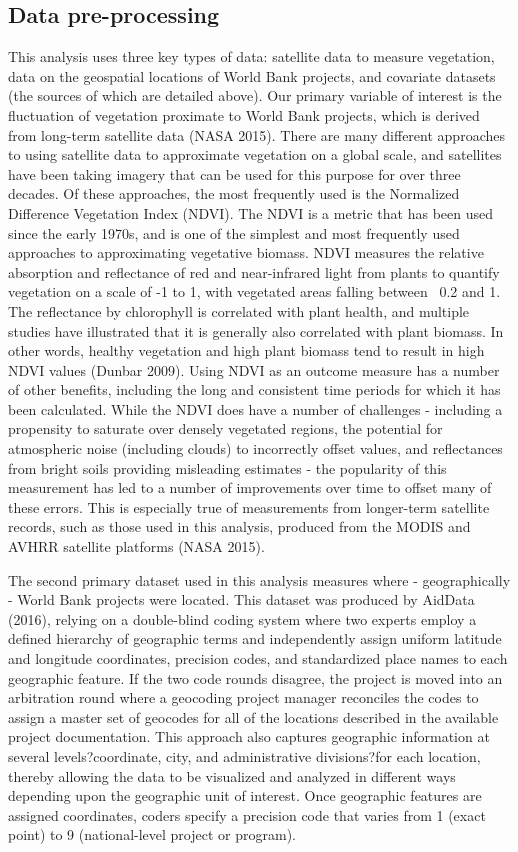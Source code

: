 \subsection{Data pre-processing}
  This analysis uses three key types of data: satellite data to measure vegetation, data on the geospatial locations of World Bank projects, and covariate datasets (the sources of which are detailed above). 
Our primary variable of interest is the fluctuation of vegetation proximate to World Bank projects, which is derived from long-term satellite data (NASA 2015). 
There are many different approaches to using satellite data to approximate vegetation on a global scale, and satellites have been taking imagery that can be used for this purpose for over three decades.  
Of these approaches, the most frequently used is the Normalized Difference Vegetation Index (NDVI).  The NDVI is a metric that has been used since the early 1970s, and is one of the simplest and most frequently used approaches to approximating vegetative biomass.  
NDVI measures the relative absorption and reflectance of red and near-infrared light from plants to quantify vegetation on a scale of -1 to 1, with vegetated areas falling between ~0.2 and 1. 
The reflectance by chlorophyll is correlated with plant health, and multiple studies have illustrated that it is generally also correlated with plant biomass. 
In other words, healthy vegetation and high plant biomass tend to result in high NDVI values (Dunbar 2009).  
Using NDVI as an outcome measure has a number of other benefits, including the long and consistent time periods for which it has been calculated.  
While the NDVI does have a number of challenges - including a propensity to saturate over densely vegetated regions, the potential for atmospheric noise (including clouds) to incorrectly offset values, and reflectances from bright soils providing misleading estimates - the popularity of this measurement has led to a number of improvements over time to offset many of these errors.  
This is especially true of measurements from longer-term satellite records, such as those used in this analysis, produced from the MODIS and AVHRR satellite platforms (NASA 2015).
\par
The second primary dataset used in this analysis measures where - geographically - World Bank projects were located.  This dataset was produced by AidData (2016), relying on a double-blind coding system where two experts employ a defined hierarchy of geographic terms and independently assign uniform latitude and longitude coordinates, precision codes, and standardized place names to each geographic feature. If the two code rounds disagree, the project is moved into an arbitration round where a geocoding project manager reconciles the codes to assign a master set of geocodes for all of the locations described in the available project documentation. This approach also captures geographic information at several levels?coordinate, city, and administrative divisions?for each location, thereby allowing the data to be visualized and analyzed in different ways depending upon the geographic unit of interest. Once geographic features are assigned coordinates, coders specify a precision code that varies from 1 (exact point) to 9 (national-level project or program).
